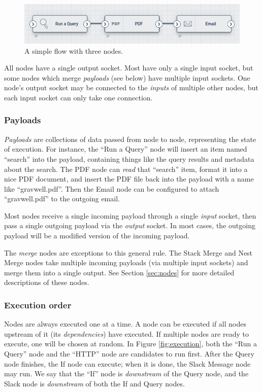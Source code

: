 \begin{figure}
	\includegraphics[width=0.7\linewidth]{images/nodes.png}
	\caption{A simple flow with three nodes.}
	\label{fig:nodes}
\end{figure}

All nodes have a single output socket. Most have only a single input socket, but some nodes which merge \emph{payloads} (see below) have multiple input sockets. One node's output socket may be connected to the \emph{inputs} of multiple other nodes, but each input socket can only take one connection.

\subsubsection{Payloads}
\emph{Payloads} are collections of data passed from node to node, representing the state of execution. For instance, the ``Run a Query'' node will insert an item named ``search'' into the payload, containing things like the query results and metadata about the search. The PDF node can \emph{read} that ``search'' item, format it into a nice PDF document, and insert the PDF file back into the payload with a name like ``gravwell.pdf''. Then the Email node can be configured to attach ``gravwell.pdf'' to the outgoing email.

Most nodes receive a single incoming payload through a single \emph{input} socket, then pass a single outgoing payload via the \emph{output} socket. In most cases, the outgoing payload will be a modified version of the incoming payload.

The \emph{merge} nodes are exceptions to this general rule. The Stack Merge and Nest Merge nodes take multiple incoming payloads (via multiple input sockets) and merge them into a single output. See Section \ref{sec:nodes} for more detailed descriptions of these nodes.

\subsubsection{Execution order}

Nodes are always executed one at a time. A node can be executed if all nodes upstream of it (its \emph{dependencies}) have executed. If multiple nodes are ready to execute, one will be chosen at random. In Figure \ref{fig:execution}, both the ``Run a Query'' node and the ``HTTP'' node are candidates to run first. After the Query node finishes, the If node can execute; when it is done, the Slack Message node may run. We say that the ``If'' node is \emph{downstream} of the Query node, and the Slack node is \emph{downstream} of both the If and Query nodes.

